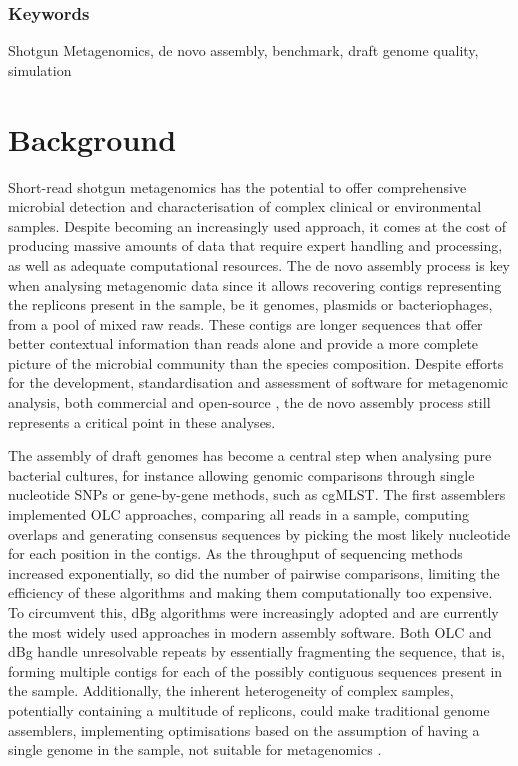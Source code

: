 \subsubsection{Keywords}

Shotgun Metagenomics, de novo assembly, benchmark, draft genome quality, simulation

\section{Background}

Short-read shotgun metagenomics has the potential to offer comprehensive microbial detection and characterisation of complex clinical or environmental samples.  Despite becoming an increasingly used approach, it comes at the cost of producing massive amounts of data that require expert handling and processing, as well as adequate computational resources. The de novo assembly process is key when analysing metagenomic data since it allows recovering contigs representing the replicons present in the sample, be it genomes, plasmids or bacteriophages, from a pool of mixed raw reads. These contigs are longer sequences that offer better contextual information than reads alone and provide a more complete picture of the microbial community than the species composition. Despite efforts for the development, standardisation and assessment of software for metagenomic analysis, both commercial and open-source \cite{angers-loustau_challenges_2018,gruening_recommendations_2019, sczyrba_critical_2017, couto_critical_2018, meyer_critical_2021}, the de novo assembly process still represents a critical point in these analyses.

The assembly of draft genomes has become a central step when analysing pure bacterial cultures, for instance allowing genomic comparisons through single nucleotide \ac{SNP}s or gene-by-gene methods, such as \ac{cgMLST}. The first assemblers implemented \ac{OLC} approaches, comparing all reads in a sample, computing overlaps and generating consensus sequences by picking the most likely nucleotide for each position in the contigs. As the throughput of sequencing methods increased exponentially, so did the number of pairwise comparisons, limiting the efficiency of these algorithms and making them computationally too expensive. To circumvent this, \ac{dBg} algorithms were increasingly adopted and are currently the most widely used approaches in modern assembly software. Both \ac{OLC} and \ac{dBg} handle unresolvable repeats by essentially fragmenting the sequence, that is, forming multiple contigs for each of the possibly contiguous sequences present in the sample. Additionally, the inherent heterogeneity of complex samples, potentially containing a multitude of replicons, could make traditional genome assemblers, implementing optimisations based on the assumption of having a single genome in the sample, not suitable for metagenomics \cite{ayling_new_2020}.

